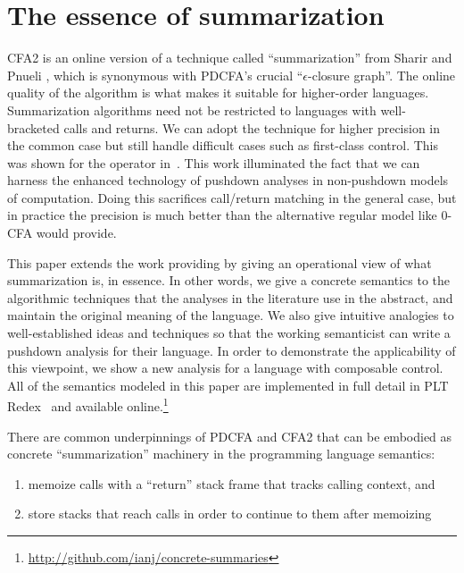 \section{The essence of summarization}

CFA2 is an online version of a technique called ``summarization'' from Sharir and Pnueli \citep[Chapter 7]{local:muchnick:jones:flow-analysis:1981}, which is synonymous with PDCFA's crucial ``$\epsilon$-closure graph''.
%
The online quality of the algorithm is what makes it suitable for higher-order languages.
%
Summarization algorithms need not be restricted to languages with well-bracketed calls and returns.
%
We can adopt the technique for higher precision in the common case but still handle difficult cases such as first-class control.
%
This was shown for the  operator in~\citet{ianjohnson:Vardoulakis2011Pushdown}.
%
This work illuminated the fact that we can harness the enhanced technology of pushdown analyses in non-pushdown models of computation.
%
Doing this sacrifices call/return matching in the general case, but in practice the precision is much better than the alternative regular model like 0-CFA would provide.

This paper extends the work providing  by giving an operational view of what summarization is, in essence.
%
In other words, we give a concrete semantics to the algorithmic techniques that the analyses in the literature use in the abstract, and maintain the original meaning of the language.
%
We also give intuitive analogies to well-established ideas and techniques so that the working semanticist can write a pushdown analysis for their language.
%
In order to demonstrate the applicability of this viewpoint, we show a new analysis for a language with composable control.
%
All of the semantics modeled in this paper are implemented in full detail in PLT Redex~\citep{ianjohnson:Felleisen:2009:SEP:1795772} and available online.\footnote{\url{http://github.com/ianj/concrete-summaries}}

There are common underpinnings of PDCFA and CFA2 that can be embodied as concrete ``summarization'' machinery in the programming language semantics: 
\begin{enumerate}
\item{memoize calls with a ``return'' stack frame that tracks calling context, and}
\item{store stacks that reach calls in order to continue to them after memoizing}
\end{enumerate}

